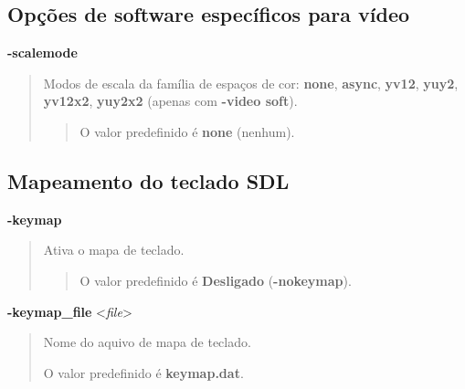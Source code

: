 \documentclass[letterpaper,10pt,brazil]{sphinxmanual}
\begin{document}
\subsection{Opções de software específicos para vídeo}
\label{commandline/sdlconfig:opcoes-de-software-especificos-para-video}\label{commandline/sdlconfig:mame-scommandline-scalemode}
\textbf{-scalemode}
\begin{quote}

Modos de escala da família de espaços de cor: \textbf{none}, \textbf{async},
\textbf{yv12}, \textbf{yuy2}, \textbf{yv12x2}, \textbf{yuy2x2} (apenas com \textbf{-video
soft}).
\begin{quote}

O valor predefinido é \textbf{none} (nenhum).
\end{quote}
\end{quote}


\subsection{Mapeamento do teclado SDL}
\label{commandline/sdlconfig:mapeamento-do-teclado-sdl}\label{commandline/sdlconfig:mame-scommandline-keymap}
\textbf{-keymap}
\begin{quote}

Ativa o mapa de teclado.
\begin{quote}

O valor predefinido é \textbf{Desligado} (\textbf{-nokeymap}).
\end{quote}
\end{quote}
\label{commandline/sdlconfig:mame-scommandline-keymapfile}
\textbf{-keymap\_file} \textless{}\emph{file}\textgreater{}
\begin{quote}

Nome do aquivo de mapa de teclado.

O valor predefinido é \textbf{keymap.dat}.
\end{quote}
\end{document}
